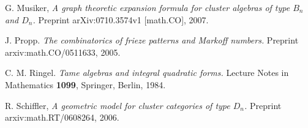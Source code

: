 \documentclass[a4paper]{amsart}
\begin{document}
\begin{thebibliography}{CoCo73b}
G. Musiker, 
\textit{A graph theoretic expansion formula for cluster algebras of type
$B_n$ and $D_n$.}
Preprint arXiv:0710.3574v1 [math.CO], 2007.

J. Propp.
\textit{The combinatorics of frieze patterns and Markoff numbers.}
Preprint arxiv:math.CO/0511633, 2005.

C. M. Ringel.
\textit{Tame algebras and integral quadratic forms.}
Lecture Notes in Mathematics \textbf{1099}, Springer, Berlin, 1984.

R. Schiffler,
\textit{A geometric model for cluster categories of type $D_n$.}
Preprint arxiv:math.RT/0608264, 2006.

\end{thebibliography}
\end{document}
